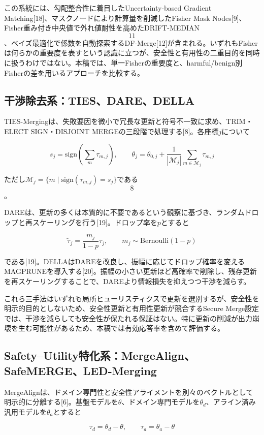 この系統には、勾配整合性に着目したUncertainty-based Gradient Matching[18]、マスクノードにより計算量を削減したFisher Mask Nodes[9]、Fisher重み付き中央値で外れ値耐性を高めたDRIFT-MEDIAN\[11\]、ベイズ最適化で係数を自動探索するDF-Merge[12]が含まれる。いずれもFisherは何らかの重要度を表すという認識に立つが、安全性と有用性の二重目的を同時に扱うわけではない。本稿では、単一Fisherの重要度と、harmful/benign別Fisherの差を用いるアプローチを比較する。

\subsection{干渉除去系：TIES、DARE、DELLA}

TIES-Mergingは、失敗要因を微小で冗長な更新と符号不一致に求め、TRIM・ELECT SIGN・DISJOINT MERGEの三段階で処理する[8]。各座標\(j\)について

\[
s_j=\mathrm{sign}\left(\sum_m \tau_{m,j}\right),\qquad
\theta_j=\theta_{0,j}+\frac{1}{|\mathcal{M}_j|}\sum_{m\in\mathcal{M}_j}\tau_{m,j}
\tag{6}
\]

ただし\(\mathcal{M}_j=\{m\mid \mathrm{sign}(\tau_{m,j})=s_j\}\)である\[8\]。

DAREは、更新の多くは本質的に不要であるという観察に基づき、ランダムドロップと再スケーリングを行う[19]。ドロップ率を\(p\)とすると

\[
\tilde{\tau}_j=\frac{m_j}{1-p}\tau_j,\qquad m_j\sim\mathrm{Bernoulli}(1-p)
\tag{7}
\]

である[19]。DELLAはDAREを改良し、振幅に応じてドロップ確率を変えるMAGPRUNEを導入する[20]。振幅の小さい更新ほど高確率で削除し、残存更新を再スケーリングすることで、DAREより情報損失を抑えつつ干渉を減らす。

これら三手法はいずれも局所ヒューリスティクスで更新を選別するが、安全性を明示的目的としないため、安全性更新と有用性更新が競合するSecure Merge設定では、干渉を減らしても安全性が保たれる保証はない。特に更新の削減が出力崩壊を生む可能性があるため、本稿では有効応答率を含めて評価する。

\subsection{Safety–Utility特化系：MergeAlign、SafeMERGE、LED-Merging}

MergeAlignは、ドメイン専門性と安全性アライメントを別々のベクトルとして明示的に分離する[6]。基盤モデルを\(\theta\)、ドメイン専門モデルを\(\theta_d\)、アライン済み汎用モデルを\(\theta_a\)とすると

\[
\tau_d=\theta_d-\theta,\qquad \tau_a=\theta_a-\theta
\tag{8}
\]

